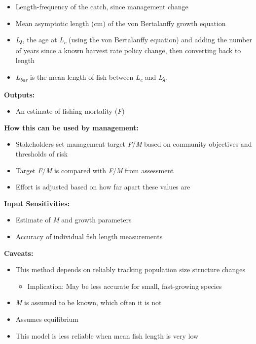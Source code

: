 \documentclass[]{book}
\providecommand{\tightlist}{%
  \setlength{\itemsep}{0pt}\setlength{\parskip}{0pt}}
\begin{document}
\begin{itemize}
\item
  Length-frequency of the catch, since management change
\item
  Mean asymptotic length (cm) of the von Bertalanffy growth equation
\item
  \emph{L\textsubscript{λ}}, the age at \emph{L\textsubscript{c}} (using
  the von Bertalanffy equation) and adding the number of years since a
  known harvest rate policy change, then converting back to length
\item
  \emph{L\textsubscript{bar}} is the mean length of fish between
  \emph{L\textsubscript{c}} and \emph{L\textsubscript{λ}}.
\end{itemize}

\textbf{Outputs:}

\begin{itemize}
\tightlist
\item
  An estimate of fishing mortality (\emph{F})
\end{itemize}

\textbf{How this can be used by management: }

\begin{itemize}
\item
  Stakeholders set management target \emph{F}/\emph{M} based on
  community objectives and thresholds of risk
\item
  Target \emph{F}/\emph{M} is compared with \emph{F}/\emph{M} from
  assessment
\item
  Effort is adjusted based on how far apart these values are
\end{itemize}

\textbf{Input Sensitivities: }

\begin{itemize}
\item
  Estimate of \emph{M} and growth parameters
\item
  Accuracy of individual fish length measurements
\end{itemize}

\textbf{Caveats: }

\begin{itemize}
\item
  This method depends on reliably tracking population size structure
  changes

  \begin{itemize}
  \tightlist
  \item
    Implication: May be less accurate for small, fast-growing species
  \end{itemize}
\item
  \emph{M} is assumed to be known, which often it is not
\item
  Assumes equilibrium
\item
  This model is less reliable when mean fish length is very low
\end{itemize}
\end{document}
